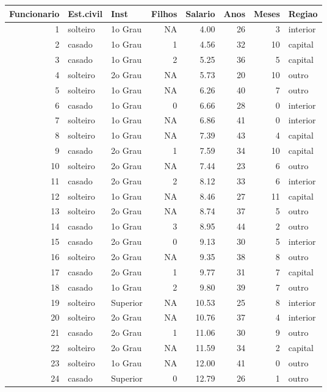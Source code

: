 \documentclass[
  10pt,
  a4paper]{book}
\begin{document}
\begin{tabular}{r|l|l|r|r|r|r|l}
\hline
Funcionario & Est.civil & Inst & Filhos & Salario & Anos & Meses & Regiao\\
\hline
1 & solteiro & 1o Grau & NA & 4.00 & 26 & 3 & interior\\
\hline
2 & casado & 1o Grau & 1 & 4.56 & 32 & 10 & capital\\
\hline
3 & casado & 1o Grau & 2 & 5.25 & 36 & 5 & capital\\
\hline
4 & solteiro & 2o Grau & NA & 5.73 & 20 & 10 & outro\\
\hline
5 & solteiro & 1o Grau & NA & 6.26 & 40 & 7 & outro\\
\hline
6 & casado & 1o Grau & 0 & 6.66 & 28 & 0 & interior\\
\hline
7 & solteiro & 1o Grau & NA & 6.86 & 41 & 0 & interior\\
\hline
8 & solteiro & 1o Grau & NA & 7.39 & 43 & 4 & capital\\
\hline
9 & casado & 2o Grau & 1 & 7.59 & 34 & 10 & capital\\
\hline
10 & solteiro & 2o Grau & NA & 7.44 & 23 & 6 & outro\\
\hline
11 & casado & 2o Grau & 2 & 8.12 & 33 & 6 & interior\\
\hline
12 & solteiro & 1o Grau & NA & 8.46 & 27 & 11 & capital\\
\hline
13 & solteiro & 2o Grau & NA & 8.74 & 37 & 5 & outro\\
\hline
14 & casado & 1o Grau & 3 & 8.95 & 44 & 2 & outro\\
\hline
15 & casado & 2o Grau & 0 & 9.13 & 30 & 5 & interior\\
\hline
16 & solteiro & 2o Grau & NA & 9.35 & 38 & 8 & outro\\
\hline
17 & casado & 2o Grau & 1 & 9.77 & 31 & 7 & capital\\
\hline
18 & casado & 1o Grau & 2 & 9.80 & 39 & 7 & outro\\
\hline
19 & solteiro & Superior & NA & 10.53 & 25 & 8 & interior\\
\hline
20 & solteiro & 2o Grau & NA & 10.76 & 37 & 4 & interior\\
\hline
21 & casado & 2o Grau & 1 & 11.06 & 30 & 9 & outro\\
\hline
22 & solteiro & 2o Grau & NA & 11.59 & 34 & 2 & capital\\
\hline
23 & solteiro & 1o Grau & NA & 12.00 & 41 & 0 & outro\\
\hline
24 & casado & Superior & 0 & 12.79 & 26 & 1 & outro\\

\end{tabular}
\end{document}
